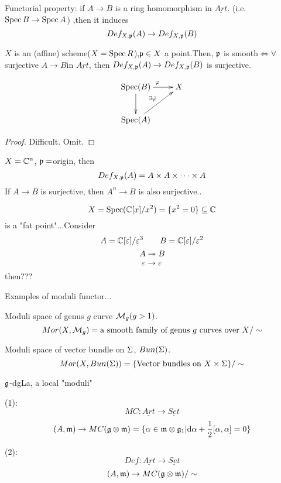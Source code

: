 Functorial property: if $A\to B$ is a ring homomorphism in $\underline{Art}$.
(i.e. $\operatorname{Spec} B\to\operatorname{Spec} A$) ,then it induces 
$$Def_{X,\mathfrak{p}}(A)\to Def_{X,\mathfrak{p}}(B)$$

\begin{thm}

$X$ is an (affine) scheme($X=\operatorname{Spec} R$),$\mathfrak{p}\in X$ a point.Then,
$\mathfrak{p}$ is smooth$\iff\forall$ surjective $A\to B$in $\underline{Art}$,
then $Def_{X,\mathfrak{p}}(A)\to Def_{X,\mathfrak{p}}(B)$ is surjective.
\end{thm}

$$
  \xymatrix{
    \Spec(B) \ar[r]^\fai  \ar[d]
   &X
  \\
    \Spec(A) \ar[ru]^{\exists\tilde{\fai}}
  }
$$

\begin{proof}
Difficult. Omit.
\end{proof}

\begin{example}
$X=\mathbb{C}^n$, $\mathfrak{p}=$origin, then
$$Def_{X,\mathfrak{p}}(A)=A\times A\times\cdots\times A$$
If $A\to B$ is surjective, then $A^n\to B$ is also surjective..
\end{example}

\begin{example}
$$X=\operatorname{Spec}(\mathbb{C}[x]/x^2)=\{x^2=0\}\subseteq\mathbb{C}$$
is a "fat point"...Consider
$$A=\mathbb{C}[\varepsilon]/\varepsilon^3\qquad B=\mathbb{C}[\varepsilon]/\varepsilon^2$$
$$A\twoheadrightarrow B$$
$$\varepsilon\to\varepsilon$$
then???
\end{example}

Examples of moduli functor...

\begin{example}
Moduli space of genus $g$ curve $\mathcal{M}_g(g>1)$.
$$Mor(X,\mathcal{M}_g)=\text{a smooth family of genus $g$ curves over $X$}/\sim$$
\end{example}

\begin{example}Moduli space of vector bundle on $\Sigma$, $Bun(\Sigma)$.
$$Mor(X,Bun(\Sigma))=\{\text{Vector bundles on $X\times\Sigma$}\}/\sim$$
\end{example}

$\mathfrak{g}$-dgLa, a local "moduli"

(1):
$$MC:\underline{Art}\to\underline{Set}$$
$$(A,\mathfrak{m})\to MC(\mathfrak{g}\otimes \mathfrak{m})
=\{\alpha\in\mathfrak{m}\otimes\mathfrak{g}_1|\mathrm{d}\alpha+\frac{1}{2}[\alpha,\alpha]=0\}$$

(2):
$$Def:\underline{Art}\to\underline{Set}$$
$$(A,\mathfrak{m})\to MC(\mathfrak{g}\otimes \mathfrak{m})/\sim$$

